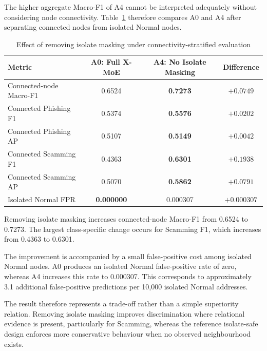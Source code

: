 \documentclass{ieeeaccess}
\begin{document}
The higher aggregate Macro-F1 of A4 cannot be interpreted adequately without considering node connectivity. Table~\ref{tab:connectivity_results} therefore compares A0 and A4 after separating connected nodes from isolated Normal nodes.

\begin{table}[t]
\centering
\caption{Effect of removing isolate masking under connectivity-stratified evaluation}
\label{tab:connectivity_results}

\renewcommand{\arraystretch}{1.12}
\setlength{\tabcolsep}{5pt}
\scriptsize

\begin{tabular}{lccc}
\toprule
\textbf{Metric} &
\textbf{A0: Full X-MoE} &
\textbf{A4: No Isolate Masking} &
\textbf{Difference} \\
\midrule

Connected-node Macro-F1 &
0.6524 &
\textbf{0.7273} &
$+0.0749$ \\

Connected Phishing F1 &
0.5374 &
\textbf{0.5576} &
$+0.0202$ \\

Connected Phishing AP &
0.5107 &
\textbf{0.5149} &
$+0.0042$ \\

Connected Scamming F1 &
0.4363 &
\textbf{0.6301} &
$+0.1938$ \\

Connected Scamming AP &
0.5070 &
\textbf{0.5862} &
$+0.0791$ \\

Isolated Normal FPR &
\textbf{0.000000} &
0.000307 &
$+0.000307$ \\

\bottomrule
\end{tabular}
\end{table}

Removing isolate masking increases connected-node Macro-F1 from 0.6524 to 0.7273. The largest class-specific change occurs for Scamming F1, which increases from 0.4363 to 0.6301.

The improvement is accompanied by a small false-positive cost among isolated Normal nodes. A0 produces an isolated Normal false-positive rate of zero, whereas A4 increases this rate to 0.000307. This corresponds to approximately 3.1 additional false-positive predictions per 10,000 isolated Normal addresses.

The result therefore represents a trade-off rather than a simple superiority relation. Removing isolate masking improves discrimination where relational evidence is present, particularly for Scamming, whereas the reference isolate-safe design enforces more conservative behaviour when no observed neighbourhood exists.
\end{document}
